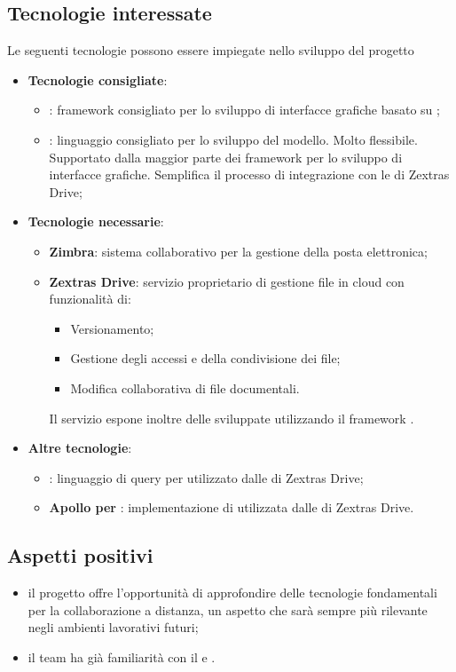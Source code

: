 \subsection{Tecnologie interessate}
Le seguenti tecnologie possono essere impiegate nello sviluppo del progetto
\begin{itemize}
\item \textbf{Tecnologie consigliate}:
\begin{itemize}
    \item \textbf{}: framework consigliato per lo sviluppo di interfacce grafiche basato su ;
    \item \textbf{}: linguaggio consigliato per lo sviluppo del modello. Molto flessibile. Supportato dalla maggior parte dei framework per lo sviluppo di interfacce grafiche. 
    Semplifica il processo di integrazione con le  di Zextras Drive;
    \end{itemize}
\newpage
\item \textbf{Tecnologie necessarie}:
    \begin{itemize}
    \item \textbf{Zimbra}: sistema collaborativo per la gestione della posta elettronica;
    \item \textbf{Zextras Drive}: servizio proprietario di gestione file in cloud con funzionalità di:
        \begin{itemize}
        \item Versionamento;
        \item Gestione degli accessi e della condivisione dei file;
        \item Modifica collaborativa di file documentali.
        \end{itemize}
    Il servizio espone inoltre delle  sviluppate utilizzando il framework .
\end{itemize}
\item \textbf{Altre tecnologie}:
    \begin{itemize}
    \item \textbf{}: linguaggio di query per  utilizzato dalle  di Zextras Drive;
    \item \textbf{Apollo per }: implementazione di  utilizzata dalle  di Zextras Drive.
    \end{itemize}
\end{itemize}

\subsection{Aspetti positivi}
\begin{itemize}
\item il progetto offre l'opportunità di approfondire delle tecnologie fondamentali per la collaborazione a distanza, un aspetto che sarà sempre più rilevante negli ambienti lavorativi futuri;
\item il team ha già familiarità con il  e .
\end{itemize}

